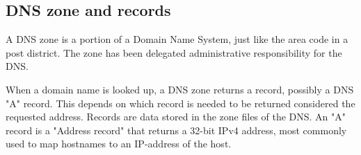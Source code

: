 \subsection{DNS zone and records}
A DNS zone is a portion of a Domain Name System, just like the area code in a post district. The zone has been delegated administrative responsibility for the DNS.

When a domain name is looked up,  a DNS zone returns a record, possibly a DNS "A" record. This depends on which record is needed to be returned considered the requested address. Records are data stored in the zone files of the DNS. An "A" record is a "Address record" that returns a 32-bit IPv4 address, most commonly used to map hostnames to an IP-address of the host.